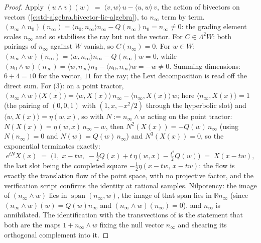 \documentclass[11pt]{article}
\theoremstyle{definition}
\theoremstyle{plain}
\providecommand{\R}{}\renewcommand{\R}{\mathbb{R}}
\providecommand{\nInf}{}\renewcommand{\nInf}{n_\infty}
\providecommand{\nO}{}\renewcommand{\nO}{n_0}
\providecommand{\ip}{}\renewcommand{\ip}[2]{\langle #1, #2\rangle}
\begin{document}
\begin{proof}
Apply $(u \wedge v)(w) \;=\; \ip{v}{w}\,u - \ip{u}{w}\,v$, the action of bivectors on vectors (\ref{c:std-algebra.bivector-lie-algebra}), to $\nInf$ term by term. $(\nInf \wedge \nO)(\nInf) = \ip{\nO}{\nInf}\nInf - Q(\nInf)\nO = \nInf \neq 0$: the grading element scales $\nInf$ and so stabilises the ray but not the vector. For $C \in \Lambda^2 W$: both pairings of $\nInf$ against $W$ vanish, so $C(\nInf) = 0$. For $w \in W$: $(\nInf \wedge w)(\nInf) = \ip{w}{\nInf}\nInf - Q(\nInf)w = 0$, while $(\nO \wedge w)(\nInf) = \ip{w}{\nInf}\nO - \ip{\nO}{\nInf}w = -w \neq 0$. Summing dimensions: $6 + 4 = 10$ for the vector, $11$ for the ray; the Levi decomposition is read off the direct sum. For (3): on a point tractor, $(\nInf \wedge w)\bigl(X(x)\bigr) = \ip{w}{X(x)}\,\nInf - \ip{\nInf}{X(x)}\,w$; here $\ip{\nInf}{X(x)} = 1$ (the pairing of $(0,0,1)$ with $(1, x, -x^2/2)$ through the hyperbolic slot) and $\ip{w}{X(x)} = \eta(w, x)$, so with $N := \nInf \wedge w$ acting on the point tractor: $N(X(x)) = \eta(w, x)\,\nInf - w$, then $N^2(X(x)) = -Q(w)\,\nInf$ (using $N(\nInf) = 0$ and $N(w) = Q(w)\,\nInf$) and $N^3(X(x)) = 0$, so the exponential terminates exactly:
\[
e^{tN} X(x) \;=\; \bigl(1,\; x - tw,\; -\tfrac12Q(x) + t\,\eta(w,x) - \tfrac{t^2}{2}Q(w)\bigr) \;=\; X(x - tw),
\]
the last slot being the completed square $-\tfrac12\eta(x - tw,\, x - tw)$: the flow is exactly the translation flow of the point space, with no projective factor, and the verification script confirms the identity at rational samples. Nilpotency: the image of $(\nInf \wedge w)$ lies in $\operatorname{span}(\nInf, w)$, the image of that span lies in $\R \nInf$ (since $(\nInf\wedge w)(w) = Q(w)\nInf$ and $(\nInf\wedge w)(\nInf) = 0$), and $\nInf$ is annihilated. The identification with the transvections of \cite{ButlerT1} is the statement that both are the maps $1 + \nInf \wedge w$ fixing the null vector $\nInf$ and shearing its orthogonal complement into it.

\end{proof}
\end{document}
